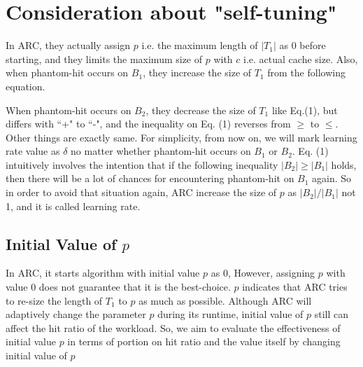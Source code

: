 \section{Consideration about "self-tuning"}

In ARC, they actually assign $p$ i.e. the maximum length of $|T_1|$ as 0 before starting, and they limits the maximum size of $p$ with $c$ i.e. actual cache size. Also, when phantom-hit occurs on $B_1$, they increase the size of $T_1$ from the following equation. 

\vspace{0.3cm}

\vspace{0.2cm}
When phantom-hit occurs on $B_2$, they decrease the size of $T_1$ like Eq.(1), but differs with ``+" to ``-", and the inequality on Eq. (1) reverses from $\geq$ to $\leq$. Other things are exactly same. For simplicity, from now on, we will mark learning rate value as $\delta$ no matter whether phantom-hit occurs on $B_1$ or $B_2$. Eq. (1) intuitively involves the intention that if the following inequality $|B_2| \geq |B_1|$ holds, then there will be a lot of chances for encountering phantom-hit on $B_1$ again. So in order to avoid that situation again, ARC increase the size of $p$ as $|B_2|/|B_1|$ not 1, and it is called learning rate.

\subsection{Initial Value of $p$}
In ARC, it starts algorithm with initial value $p$ as 0, However, assigning $p$ with value 0 does not guarantee that it is the best-choice. $p$ indicates that ARC tries to re-size the length of $T_1$ to $p$ as much as possible. Although ARC will adaptively change the parameter $p$ during its runtime, initial value of $p$ still can affect the hit ratio of the workload. So, we aim to evaluate the effectiveness of initial value $p$ in terms of portion on hit ratio and the value itself by changing initial value of $p$   



